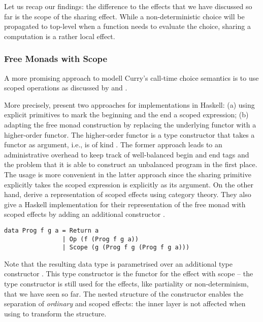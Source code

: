 Let us recap our findings: the difference to the effects that we
have discussed so far is the scope of the sharing effect.
While a non-deterministic choice will be propagated to top-level when
a function needs to evaluate the choice, sharing a computation is a
rather local effect.

\subsubsection{Free Monads with Scope}

A more promising approach to modell Curry's call-time choice semantics
is to use scoped operations as discussed by \citet{wu2014effect} and
\citet{pirog2018syntax}.

More precisely, \citeauthor{wu2014effect} present two approaches for
implementations in Haskell: (a) using explicit primitives to mark the
beginning and the end a scoped expression; (b) adapting the free monad
construction by replacing the underlying functor with a higher-order
functor.
The higher-order functor is a type constructor that takes a functor as
argument, i.e., is of kind \hinl{(* -> *) -> * -> *}.
The former approach leads to an administrative overhead to keep track
of well-balanced begin and end tags and the problem that it is able to
construct an unbalanced program in the first place.
The usage is more convenient in the latter approach since the sharing
primitive explicitly takes the scoped expression is explicitly as its
argument.
On the other hand, \citeauthor{pirog2018syntax} derive a
representation of scoped effects using category theory.
They also give a Haskell implementation for their representation of the
free monad with scoped effects by adding an additional constructor
.

\begin{verbatim}
data Prog f g a = Return a
                | Op (f (Prog f g a))
                | Scope (g (Prog f g (Prog f g a)))
\end{verbatim}

Note that the resulting data type  is parametrised over an
additional type constructor .
This type constructor is the functor for the effect with scope -- the
type constructor  is still used for the effects, like
partiality or non-determinism, that we have seen so far.
The nested structure of the  constructor enables the
separation of \emph{ordinary} and scoped effects: the inner
 layer is not affected when using \hinl{(>>=)} to transform
the structure.

